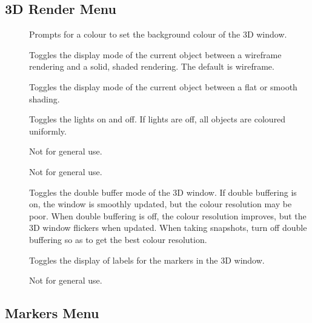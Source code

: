 \subsection{3D Render Menu}

\begin{description}
\item[]  Prompts for a colour to
        set the background colour of the 3D window.
\item[]  Toggles the display mode of the
        current object between a wireframe rendering and a solid, shaded 
        rendering.  The default is wireframe.
\item[]  Toggles the display mode of the
        current object between a flat or smooth shading.
\item[]  Toggles the lights on and off.  If lights
        are off, all objects are coloured uniformly.
\item[]  Not for general use.
\item[]  Not for general use.
\item[]  Toggles the double buffer mode of the
        3D window.  If double buffering is on, the window is smoothly
        updated, but the colour resolution may be poor.
        When double buffering is off, the colour resolution improves, but
        the 3D window flickers when updated.  When taking snapshots,
        turn off double buffering so as to get the best colour resolution.
\item[]  Toggles the display of labels
        for the markers in the 3D window.
\item[]  Not for general use.
\end{description}

\subsection{Markers Menu}

